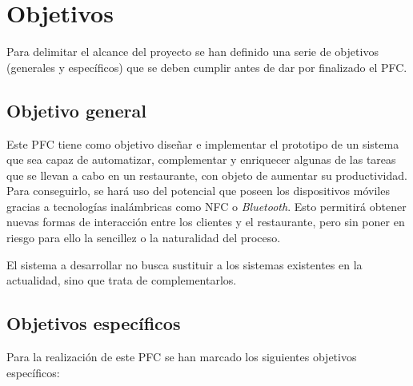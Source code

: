 
\chapter{Objetivos}
Para delimitar el alcance del proyecto se han definido una serie de
objetivos (generales y específicos) que se deben cumplir antes de dar
por finalizado el \acs{PFC}.

\section{Objetivo general}
Este PFC tiene como objetivo diseñar e implementar el prototipo de un sistema
que sea capaz de automatizar, complementar y enriquecer algunas de las tareas 
que se llevan a cabo en un restaurante, con objeto de aumentar su
productividad. Para conseguirlo, se hará uso del potencial que poseen los 
dispositivos móviles gracias a tecnologías inalámbricas como \acs{NFC} o
\emph{Bluetooth}. Esto permitirá obtener nuevas formas de interacción entre los 
clientes y el restaurante, pero sin poner en riesgo para ello la sencillez o la 
naturalidad del proceso.

El sistema a desarrollar no busca sustituir a los sistemas existentes en la
actualidad, sino que trata de complementarlos.

\section{Objetivos específicos}
Para la realización de este \acs{PFC} se han marcado los siguientes objetivos
específicos:
